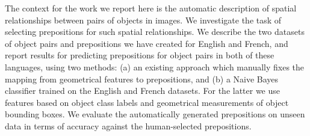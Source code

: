 The context for the work we report here is the automatic description of spatial relationships between pairs of objects in images. We investigate the task of selecting prepositions for such spatial relationships. We describe the two datasets of object pairs and prepositions we have created for English and French, and report results for predicting prepositions for object pairs in both of these languages, using two methods: (a) an existing approach which manually fixes the mapping from geometrical features to prepositions, and (b) a Naive Bayes classifier trained on the English and French datasets. For the latter we use features based on object class labels and geometrical measurements of object bounding boxes. We evaluate the automatically generated prepositions on unseen data in terms of accuracy against the human-selected prepositions.
